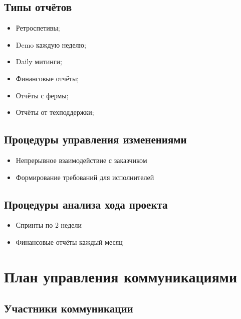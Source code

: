 \documentclass[a4paper,10pt]{article}
\begin{document}
\subsection{Типы отчётов}

    \begin{itemize}
        \item Ретроспетивы;
        \item Demo каждую неделю;
        \item Daily митинги;
        \item Финансовые отчёты;
        \item Отчёты с фермы;
        \item Отчёты от техподдержки;
    \end{itemize}


\subsection{Процедуры управления изменениями}

    \begin{itemize}
        \item Непрерывное взаимодействие с заказчиком
        \item Формирование требований для исполнителей
    \end{itemize}

\subsection{Процедуры анализа хода проекта}

    \begin{itemize}
        \item Спринты по 2 недели
        \item Финансовые отчёты каждый месяц
    \end{itemize}


\section{План управления коммуникациями}

\subsection{Участники коммуникации}
\end{document}
